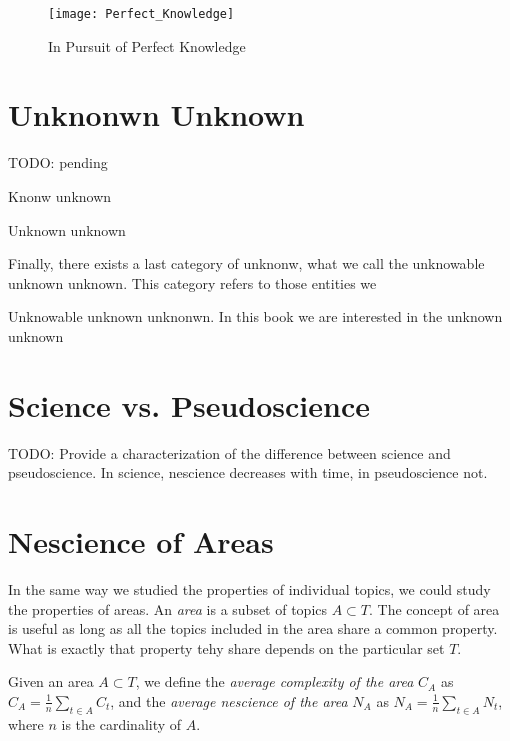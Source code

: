 \begin{figure}[h]
\centering\texttt{[image: Perfect\_Knowledge]}
\caption{\label{fig:Perfect_Knowledge}In Pursuit of Perfect Knowledge}
\end{figure}

%
%

\section{Unknonwn Unknown}

{\color{red} TODO: pending}

Knonw unknown

Unknown unknown

Finally, there exists a last category of unknonw, what we call the unknowable unknown unknown. This category refers to those entities we

Unknowable unknown unknonwn. In this book we are interested in the unknown unknown

%
%

\section{Science vs. Pseudoscience}

{\color{red} TODO: Provide a characterization of the difference between science and pseudoscience. In science, nescience decreases with time, in pseudoscience not.}

%
%

\section{Nescience of Areas}
\label{sec:nescience_areas}

In the same way we studied the properties of individual topics, we could study the properties of areas. An \emph{area} is a subset of topics $A\subset T$. The concept of area is useful as long as all the topics included in the area share a common property. What is exactly that property tehy share depends on the particular set $T$.

\begin{definition}
Given an area $A\subset T$, we define the \emph{average complexity of the area} $C_{A}$ as $C_{A}=\frac{1}{n}\sum_{t\in A}C_{t}$, and the \emph{average nescience of the area} $N_{A}$ as $N_{A}=\frac{1}{n}\sum_{t\in A}N_{t}$, where $n$ is the cardinality of $A$.
\end{definition}


